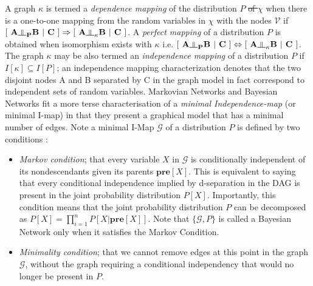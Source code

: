\documentclass[7pt]{article}
\newcommand{\inperp}{\rotatebox[origin=c]{90}{$\models$}}
\begin{document}
A graph $\kappa$ is termed a \emph{dependence mapping} of the distribution $P$ \st{of $\chi$} when there is a one-to-one mapping from the random variables in $\chi$ with the nodes $\mathcal{V}$ if $[\hspace{0.05in} \mathbf{A \inperp_P B \hspace{0.05in} \vert \hspace{0.05in} C \hspace{0.05in}}] \Rightarrow [\hspace{0.05in} \mathbf{A \inperp_\kappa B \hspace{0.05in} \vert \hspace{0.05in} C \hspace{0.05in}}]$. A \emph{perfect mapping} of a distribution $P$ is obtained when isomorphism exists with $\kappa$ i.e. $[\hspace{0.05in} \mathbf{A \inperp_P B \hspace{0.05in} \vert \hspace{0.05in} C \hspace{0.05in}}] \Leftrightarrow [\hspace{0.05in} \mathbf{A \inperp_\kappa B \hspace{0.05in} \vert \hspace{0.05in} C \hspace{0.05in}}]$. The graph $\kappa$ may be also  termed an \emph{independence mapping} of a distribution $P$ if $I [\kappa] \subseteq I[P]$; an independence mapping characterization denotes that the two disjoint nodes A and B separated by C in the graph model in fact correspond to independent sets of random variables. Markovian Networks and Bayesian Networks fit a more terse characterisation of a \emph{minimal Independence-map} (or minimal I-map) in that they present a graphical model that has a minimal number of edges. Note a minimal I-Map $\mathcal{G}$ of a distribution $P$ is defined by two conditions \cite{pearl1988probabilistic}: 
\begin{itemize}
	\item \emph{Markov condition}; that every variable $X$ in $\mathcal{G}$ is conditionally independent of its nondescendants given its parents $\mathbf{pre} [ X]$. This is equivalent to saying that every conditional independence implied by d-separation in the DAG is present in the joint probability distribution $P[X]$. Importantly, this condition means that the joint probability distribution $P$ can be decomposed as $P[X]  = \prod_{i=1}^{n} P [ X | \mathbf{pre} [ X] ]$. Note that $\{\mathcal{G}, P\}$ is called a Bayesian Network only when it satisfies the Markov Condition. 
	\item \emph{Minimality condition}; that we cannot remove edges at this point in the graph $\mathcal{G}$, without the graph requiring a conditional independency that would  no longer be present in $P$.
\end{itemize}
\end{document}
